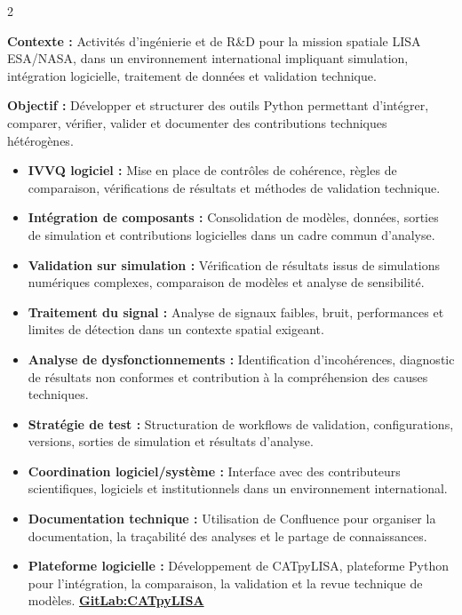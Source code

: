 \documentclass[8pt,a4paper,ragged2e,withhyper]{altacv}
\begin{document}
\begin{paracol}{2}
\divider


\textbf{Contexte :} Activités d’ingénierie et de R\&D pour la mission spatiale LISA ESA/NASA, dans un environnement international impliquant simulation, intégration logicielle, traitement de données et validation technique.

\textbf{Objectif :} Développer et structurer des outils Python permettant d’intégrer, comparer, vérifier, valider et documenter des contributions techniques hétérogènes.

\begin{itemize}
  \item \textbf{IVVQ logiciel :} Mise en place de contrôles de cohérence, règles de comparaison, vérifications de résultats et méthodes de validation technique.
  \item \textbf{Intégration de composants :} Consolidation de modèles, données, sorties de simulation et contributions logicielles dans un cadre commun d’analyse.
  \item \textbf{Validation sur simulation :} Vérification de résultats issus de simulations numériques complexes, comparaison de modèles et analyse de sensibilité.
  \item \textbf{Traitement du signal :} Analyse de signaux faibles, bruit, performances et limites de détection dans un contexte spatial exigeant.
  \item \textbf{Analyse de dysfonctionnements :} Identification d’incohérences, diagnostic de résultats non conformes et contribution à la compréhension des causes techniques.
  \item \textbf{Stratégie de test :} Structuration de workflows de validation, configurations, versions, sorties de simulation et résultats d’analyse.
  \item \textbf{Coordination logiciel/système :} Interface avec des contributeurs scientifiques, logiciels et institutionnels dans un environnement international.
  \item \textbf{Documentation technique :} Utilisation de Confluence pour organiser la documentation, la traçabilité des analyses et le partage de connaissances.
  \item \textbf{Plateforme logicielle :} Développement de CATpyLISA, plateforme Python pour l’intégration, la comparaison, la validation et la revue technique de modèles.
  \textcolor{DarkPastelRed}{\href{https://gitlab.oca.eu/gboileau/lisa_l3_tools}{\bf GitLab:CATpyLISA}}
\end{itemize}


\end{paracol}
\end{document}

